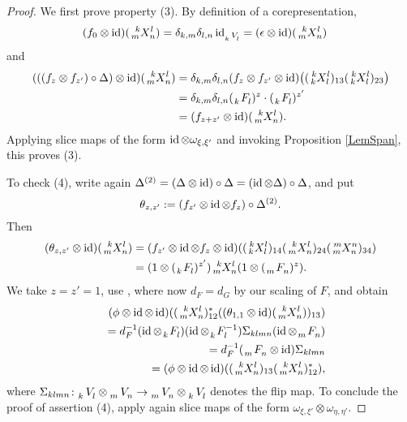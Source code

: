 \begin{proof}
    We first prove property (3). By definition of a corepresentation,
    \begin{align*}
      (f_{0}  \otimes \id)(\Gr{X}{k}{l}{m}{n}) &=
      \delta_{k,m}\delta_{l,n} \id_{\Gru{V}{k}{l}} =
      (\epsilon \otimes \id)(\Gr{X}{k}{l}{m}{n})
    \end{align*}
    and
    \begin{align*}
      (((f_{z}\otimes f_{z'})\circ \Delta) \otimes
      \id)(\Gr{X}{k}{l}{m}{n}) &=  \delta_{k,m}\delta_{l,n}(f_{z} \otimes f_{z'} \otimes
      \id)\big((\Gr{X}{k}{l}{k}{l})_{13}
      (\Gr{X}{k}{l}{k}{l})_{23}\big) \\
      &=  \delta_{k,m}\delta_{l,n}(\Grd{F}{k}{l})^{z}  \cdot (\Grd{F}{k}{l})^{z'} \\
      &= (f_{z+z'} \otimes \id)(\Gr{X}{k}{l}{m}{n}).
    \end{align*}
    Applying slice maps of the form $\operatorname{id}
    \otimes \omega_{\xi,\xi'}$ and invoking Proposition \ref{LemSpan}, this proves (3).

    To check (4), write again $ \Delta^{(2)} = (
    \Delta \otimes \operatorname{id})\circ  \Delta = (\operatorname{id} \otimes 
    \Delta) \circ \Delta$, and put \[\theta_{z,z'}:=(f_{z'} \otimes \operatorname{id}
    \otimes f_{z})\circ  \Delta^{(2)}.\] 
Then
    \begin{align*}
      (\theta_{z,z'} \otimes \id)(\Gr{X}{k}{l}{m}{n}) &= (f_{z'} \otimes
      \id \otimes f_{z} \otimes
      \id)((\Gr{X}{k}{l}{k}{l})_{14}(\Gr{X}{k}{l}{m}{n})_{24}(\Gr{X}{m}{n}{m}{n})_{34})
      \\
      &= (1 \otimes (\Grd{F}{k}{l})^{z'}) \Gr{X}{k}{l}{m}{n} (1
      \otimes (\Grd{F}{m}{n})^{z}).
    \end{align*}
    We take $z=z'=1$, use \cite[Theorem 2.21 (3)]{DCT1}, where
    now $d_{F}= d_{G}$ by our scaling of $F$, and obtain
    \begin{eqnarray*}
     && \hspace{-2cm} (\phi \otimes \id \otimes
      \id)((\Gr{X}{k}{l}{m}{n})_{12}^{*}((\theta_{1,1} \otimes
      \id)(\Gr{X}{k}{l}{m}{n}))_{13})\\ && =d_{F}^{-1}(\id \otimes
      \Grd{F}{k}{l}) (\id \otimes \Gr{F}{}{-1}{k}{l})
      \Sigma_{klmn} (\id \otimes
      \Grd{F}{m}{n}) \\
      &&=d_{F}^{-1}(\Grd{F}{m}{n} \otimes \id) \Sigma_{klmn} \\
      &&= (\phi \otimes \id \otimes
      \id)((\Gr{X}{k}{l}{m}{n})_{13}(\Gr{X}{k}{l}{m}{n})_{12}^{*}),
    \end{eqnarray*}
    where $\Sigma_{klmn}\colon \Grd{V}{k}{l} \otimes \Grd{V}{m}{n} \to
    \Grd{V}{m}{n} \otimes \Grd{V}{k}{l} $ denotes the flip map.  To
    conclude the proof of assertion (4), apply again slice maps of the
    form $\omega_{\xi,\xi'} \otimes \omega_{\eta,\eta'}$.


\end{proof}
